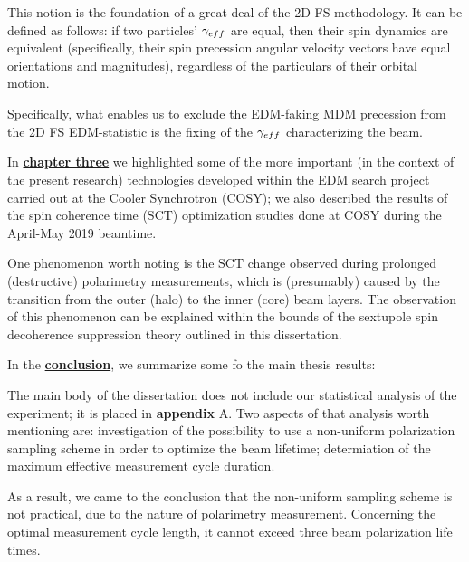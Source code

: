 This notion is the foundation of a great deal of the 2D FS methodology. It can be defined as follows: if two particles' $\gamma_{eff}$ are equal, then their spin dynamics are equivalent (specifically, their spin precession angular velocity vectors have equal orientations and magnitudes), regardless of the particulars of their orbital motion. 

Specifically, what enables us to exclude the EDM-faking MDM precession from the 2D FS EDM-statistic is the fixing of the $\gamma_{eff}$ characterizing the beam.

In \underline{\textbf{chapter three}} we highlighted some of the more important (in the context of the present research) technologies developed within the EDM search project carried out at the Cooler Synchrotron (COSY); we also described the results of the spin coherence time (SCT) optimization studies done at COSY during the April-May 2019 beamtime.

One phenomenon worth noting is the SCT change observed during prolonged (destructive) polarimetry measurements, which is (presumably) caused by the transition from the outer (halo) to the inner (core) beam layers. The observation of this phenomenon can be explained within the bounds of the sextupole spin decoherence suppression theory outlined in this dissertation.

In the \underline{\textbf{conclusion}}, we summarize some fo the main thesis results:


The main body of the dissertation does not include our statistical analysis of the experiment; it is placed in \textbf{appendix} A. Two aspects of that analysis worth mentioning are: investigation of the possibility to use a non-uniform polarization sampling scheme in order to optimize the beam lifetime; determiation of the maximum effective measurement cycle duration. 

As a result, we came to the conclusion that the non-uniform sampling scheme is not practical, due to the nature of polarimetry measurement. Concerning the optimal measurement cycle length, it cannot exceed three beam polarization life times.
